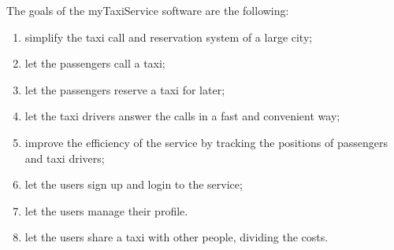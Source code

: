 The goals of the myTaxiService software are the following:
\begin{enumerate}
	\item simplify the taxi call and reservation system of a large city; \label{g-simplify}
	\item let the passengers call a taxi;  \label{g-taxicall}
	\item let the passengers reserve a taxi for later;  \label{g-reserve}
	\item let the taxi drivers answer the calls in a fast and convenient way;  \label{g-notify}
	\item improve the efficiency of the service by tracking the positions of passengers and taxi drivers;  \label{g-position}
	\item let the users sign up and login to the service;  \label{g-login}
	\item let the users manage their profile. \label{g-profile}
	\item let the users share a taxi with other people, dividing the costs. \label{g-share}
\end{enumerate}
